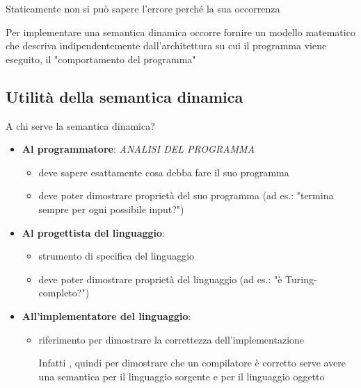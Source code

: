 Staticamente non si può sapere l'errore perché la sua occorrenza 

Per implementare una semantica dinamica occorre fornire un modello matematico che descriva indipendentemente dall'architettura su cui il programma viene eseguito, il "comportamento del programma"


\subsection{Utilità della semantica dinamica}
A chi serve la semantica dinamica?

\begin{itemize}
    \item \textbf{Al programmatore}: \textit{ANALISI DEL PROGRAMMA}
    \begin{itemize}
        \item deve sapere esattamente cosa debba fare il suo programma
        \item deve poter dimostrare proprietà del suo programma (ad es.: "termina sempre per ogni possibile input?")
    \end{itemize}
    
    \item \textbf{Al progettista del linguaggio}:
    \begin{itemize}
        \item strumento di specifica del linguaggio
        \item deve poter dimostrare proprietà del linguaggio (ad es.: "è Turing-completo?")
    \end{itemize}
    
    \item \textbf{All'implementatore del linguaggio}:
    \begin{itemize}
        \item riferimento per dimostrare la correttezza dell'implementazione
        
        Infatti , quindi per dimostrare che un compilatore è corretto serve avere una semantica per il linguaggio sorgente e per il linguaggio oggetto
    \end{itemize}
\end{itemize}

